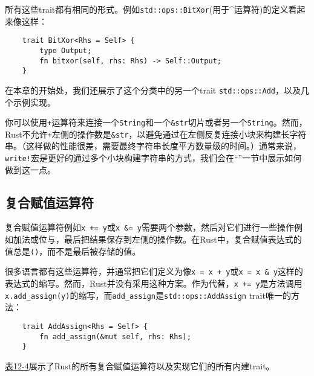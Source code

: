所有这些trait都有相同的形式。例如\texttt{std::ops::BitXor}(用于\^{}运算符)的定义看起来像这样：
\begin{verbatim}
    trait BitXor<Rhs = Self> {
        type Output;
        fn bitxor(self, rhs: Rhs) -> Self::Output;
    }
\end{verbatim}

在本章的开始处，我们还展示了这个分类中的另一个trait \texttt{std::ops::Add}，以及几个示例实现。

你可以使用\texttt{+}运算符来连接一个\texttt{String}和一个\texttt{\&str}切片或者另一个\texttt{String}。然而，Rust不允许\texttt{+}左侧的操作数是\texttt{\&str}，以避免通过在左侧反复连接小块来构建长字符串。（这样做的性能很差，需要最终字符串长度平方数量级的时间。）通常来说，\texttt{write!}宏是更好的通过多个小块构建字符串的方式，我们会在“”一节中展示如何做到这一点。

\subsection{复合赋值运算符}\label{assign}
复合赋值运算符例如\texttt{x += y}或\texttt{x \&= y}需要两个参数，然后对它们进行一些操作例如加法或位与，最后把结果保存到左侧的操作数。在Rust中，复合赋值表达式的值总是\texttt{()}，而不是最后被存储的值。

很多语言都有这些运算符，并通常把它们定义为像\texttt{x = x + y}或\texttt{x = x \& y}这样的表达式的缩写。然而，Rust并没有采用这种方案。作为代替，\texttt{x += y}是方法调用\texttt{x.add\_assign(y)}的缩写，而\texttt{add\_assign}是\texttt{std::ops::AddAssign} trait唯一的方法：
\begin{verbatim}
    trait AddAssign<Rhs = Self> {
        fn add_assign(&mut self, rhs: Rhs);
    }
\end{verbatim}

\hyperref[t12-4]{表12-4}展示了Rust的所有复合赋值运算符以及实现它们的所有内建trait。

